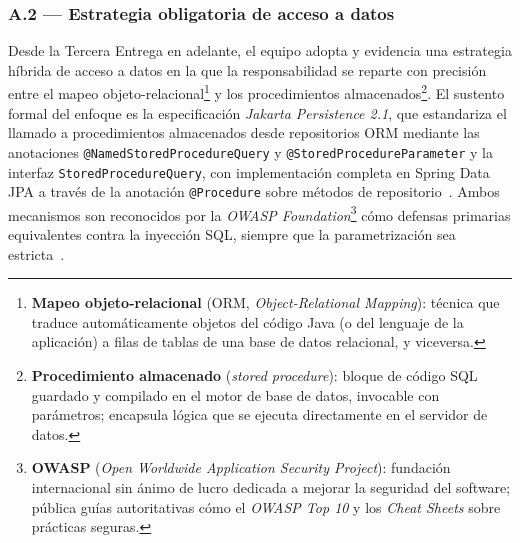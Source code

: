 \documentclass[11pt,a4paper]{article}
\begin{document}
\subsubsection*{A.2 --- Estrategia obligatoria de acceso a datos}

Desde la Tercera Entrega en adelante, el equipo adopta y evidencia una estrategia h\'{i}brida de acceso a datos en la que la responsabilidad se reparte con precisi\'{o}n entre el mapeo objeto-relacional\footnote{\textbf{Mapeo objeto-relacional} (ORM, \emph{Object-Relational Mapping}): t\'{e}cnica que traduce autom\'{a}ticamente objetos del c\'{o}digo Java (o del lenguaje de la aplicaci\'{o}n) a filas de tablas de una base de datos relacional, y viceversa.} y los procedimientos almacenados\footnote{\textbf{Procedimiento almacenado} (\emph{stored procedure}): bloque de c\'{o}digo SQL guardado y compilado en el motor de base de datos, invocable con par\'{a}metros; encapsula l\'{o}gica que se ejecuta directamente en el servidor de datos.}. El sustento formal del enfoque es la especificaci\'{o}n \emph{Jakarta Persistence 2.1}, que estandariza el llamado a procedimientos almacenados desde repositorios ORM mediante las anotaciones \texttt{@NamedStoredProcedureQuery} y \texttt{@StoredProcedureParameter} y la interfaz \texttt{StoredProcedureQuery}, con implementaci\'{o}n completa en Spring Data JPA a trav\'{e}s de la anotaci\'{o}n \texttt{@Procedure} sobre m\'{e}todos de repositorio~\cite{demichiel2013jpa21,springdata2025procedures}. Ambos mecanismos son reconocidos por la \emph{OWASP Foundation}\footnote{\textbf{OWASP} (\emph{Open Worldwide Application Security Project}): fundaci\'{o}n internacional sin \'{a}nimo de lucro dedicada a mejorar la seguridad del software; p\'{u}blica gu\'{i}as autoritativas c\'{o}mo el \emph{OWASP Top 10} y los \emph{Cheat Sheets} sobre pr\'{a}cticas seguras.} c\'{o}mo defensas primarias equivalentes contra la inyecci\'{o}n SQL, siempre que la parametrizaci\'{o}n sea estricta~\cite{owaspsqlicheatsheet,owasp2021top10}.
\end{document}
